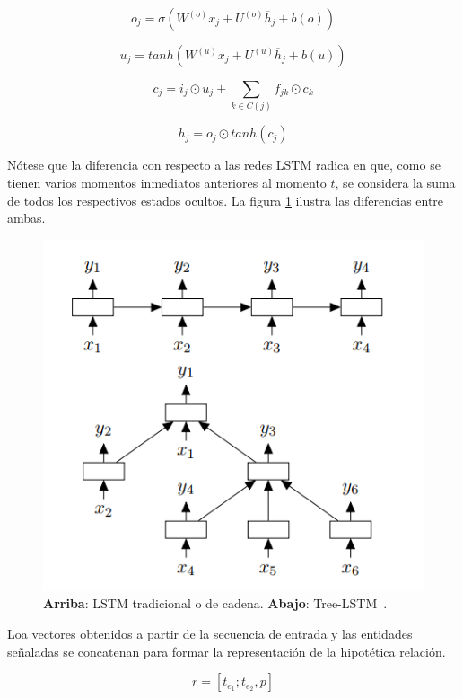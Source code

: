 \begin{equation*}
o_j = \sigma(W^{(o)}x_j + U^{(o)}\overline{h}_j + b(o))
\end{equation*}

\begin{equation*}
u_j = tanh(W^{(u)}x_j + U^{(u)}\overline{h}_j + b(u))
\end{equation*}

\begin{equation*}
c_j = i_j \odot u_j + \sum_{k\in C(j)} f_{jk} \odot c_k
\end{equation*}

\begin{equation*}
h_j = o_j \odot tanh(c_j)
\end{equation*}

Nótese que la diferencia con respecto a las redes LSTM radica en que, como se tienen varios momentos inmediatos anteriores al momento $t$, se considera la suma de todos los respectivos estados ocultos. La figura \ref{fig:lstm_cmp} ilustra las diferencias entre ambas.

\begin{figure}[h!]
	\centering
	\includegraphics[width=0.7\linewidth]{Graphics/lstm_cmp.png}
	\caption{\textbf{Arriba}: LSTM tradicional o de cadena. \textbf{Abajo}: Tree-LSTM~\cite{treeLSTM}.}\label{fig:lstm_cmp}
\end{figure}

Loa vectores obtenidos a partir de la secuencia de entrada y las entidades señaladas se concatenan para formar la representación de la hipotética relación.

\begin{equation*}
	r = [t_{e_1};t_{e_2}, p]
\end{equation*}

